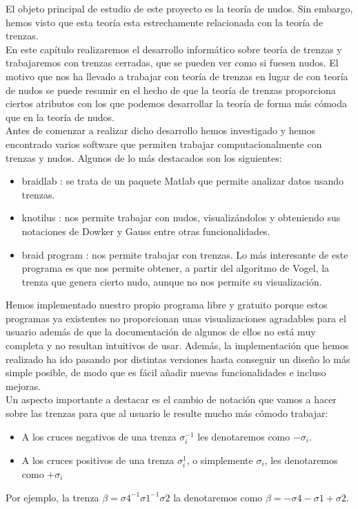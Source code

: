 El objeto principal de estudio de este proyecto es la teoría de nudos. Sin embargo, hemos visto que esta teoría esta estrechamente relacionada con la teoría de trenzas.\\ En este capítulo realizaremos el desarrollo informático sobre teoría de trenzas y trabajaremos con trenzas cerradas, que se pueden ver como si fuesen nudos. El motivo que nos ha llevado a trabajar con teoría de trenzas en lugar de con teoría de nudos se puede resumir en el hecho de que la teoría de trenzas proporciona ciertos atributos con los que podemos desarrollar la teoría de forma más cómoda que en la teoría de nudos. \\

Antes de comenzar a realizar dicho desarrollo hemos investigado y hemos encontrado varios software que permiten trabajar computacionalmente con trenzas y nudos. Algunos de lo más destacados son los siguientes:
\begin{itemize}
	\item braidlab \cite{9}: se trata de un paquete Matlab que permite analizar datos usando trenzas. 
	\item knotilus \cite{8}: nos permite trabajar con nudos, visualizándolos y obteniendo sus notaciones de Dowker y Gauss entre otras funcionalidades.
	\item braid program \cite{7}: nos permite trabajar con trenzas. Lo más interesante de este programa es que nos permite obtener, a partir del algoritmo de Vogel, la trenza que genera cierto nudo, aunque no nos permite su visualización. 
\end{itemize}

Hemos implementado nuestro propio programa libre y gratuito porque estos programas ya existentes no proporcionan unas visualizaciones agradables para el usuario además de que la documentación de algunos de ellos no está muy completa y no resultan intuitivos de usar. Además, la implementación que hemos realizado ha ido pasando por distintas versiones hasta conseguir un diseño lo más simple posible, de modo que es fácil añadir nuevas funcionalidades e incluso mejoras. \\

Un aspecto importante a destacar es el cambio de notación que vamos a hacer sobre las trenzas para que al usuario le resulte mucho más cómodo trabajar:
\begin{itemize}
	\item A los cruces negativos de una trenza $ \sigma_{i}^{-1} $ les denotaremos como $ -\sigma_{i}$.
	\item A los cruces positivos de una trenza $ \sigma_{i}^{1} $, o simplemente $ \sigma_{i} $, les denotaremos como $ +\sigma_{i} $
\end{itemize}

Por ejemplo, la trenza $\beta = \sigma4^{-1}\sigma1^{-1}\sigma2$ la denotaremos como $\beta = -\sigma4-\sigma1+\sigma2$.\\ 

